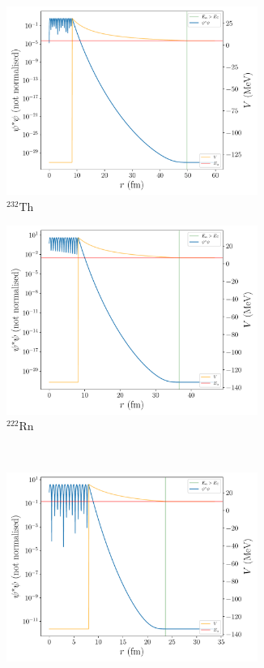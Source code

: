 \documentclass[a4paper,DIV=12,english]{scrartcl}
\begin{document}
\begin{figure}
\begin{subfigure}{0.49\textwidth}
        \includegraphics[width=0.9\textwidth]{../plots/density/th232.pdf}
        \caption{$^{232}\text{Th}$}
        \label{subfig:density_th232}
    \end{subfigure}
    \begin{subfigure}{0.49\textwidth}
        \centering
        \includegraphics[width=0.9\textwidth]{../plots/density/rn222.pdf}
        \caption{$^{222}\text{Rn}$}
        \label{subfig:density_rn222}
    \end{subfigure}\\
    \begin{subfigure}{0.49\textwidth}
        \centering
        \includegraphics[width=0.9\textwidth]{../plots/density/po212.pdf}

\end{subfigure}
\end{figure}
\end{document}
